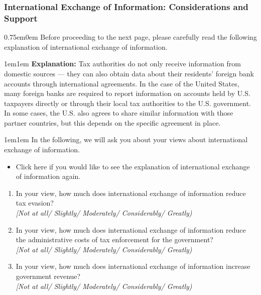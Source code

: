 \documentclass[11pt]{article}
\begin{document}
\subsubsection*{International Exchange of Information: Considerations and Support}
\begin{adjustwidth}{0.75em}{0em} Before proceeding to the next page, please carefully read the following explanation of international exchange of information.\end{adjustwidth}
\vspace{0.5em}
\begin{adjustwidth}{1em}{1em} \textbf{Explanation:} Tax authorities do not only receive information from domestic sources — they can also obtain data about their residents’ foreign bank accounts through international agreements. In the case of the United States, many foreign banks are required to report information on accounts held by U.S. taxpayers directly or through their local tax authorities to the U.S. government. In some cases, the U.S. also agrees to share similar information with those partner countries, but this depends on the specific agreement in place. \\ 
\end{adjustwidth}
\begin{adjustwidth}{1em}{1em}
In the following, we will ask you about your views about international exchange of information.
\end{adjustwidth}
\begin{itemize}
    \item[$\rightarrow$] Click here if you would like to see the explanation of international exchange of information again.
\end{itemize}
\begin{enumerate}[resume]
    \item In your view, how much does international exchange of information reduce tax evasion? \\
    \textit{[Not at all/ Slightly/ Moderately/ Considerably/ Greatly)} 
    \item In your view, how much does international exchange of information reduce the administrative costs of tax enforcement for the government? \\
    \textit{[Not at all/ Slightly/ Moderately/ Considerably/ Greatly)}  
    \item In your view, how much does international exchange of information increase government revenue? \\
    \textit{[Not at all/ Slightly/ Moderately/ Considerably/ Greatly)} 
\end{enumerate}
\end{document}
